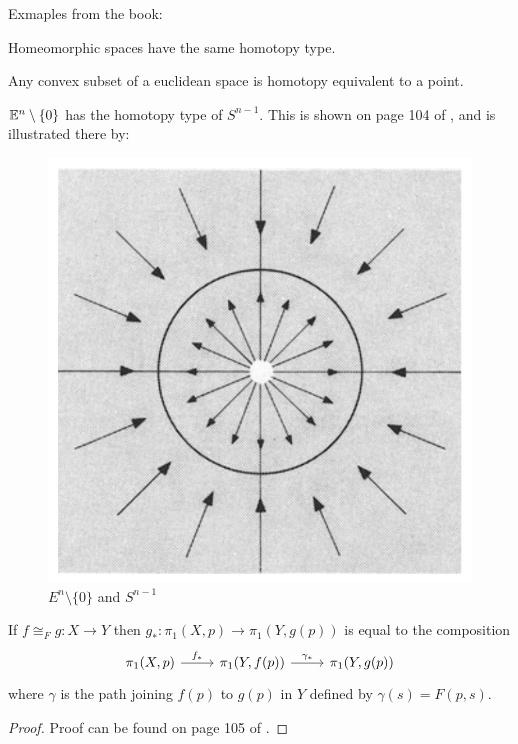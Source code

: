 Exmaples from the book:
\begin{ex}
    Homeomorphic spaces have the same homotopy type.
\end{ex}
\begin{ex}
    Any convex subset of a euclidean space is homotopy equivalent to a
    point.
\end{ex}
\begin{ex}
    $\mathbb{E}^n\setminus \{0\}$ has the homotopy type of $S^{n-1}$. This is
    shown on page 104 of \cite{book}, and is illustrated there by:
    \begin{figure}[H]
        \centering
        \includegraphics[width=0.6\linewidth]{pics/En-0-and-S-n-1.PNG}
        \caption{$E^n\setminus\{0\}$ and $S^{n-1}$}
    \end{figure}
\end{ex}

\begin{thm}
    If $f\cong_F g:X\to Y$ then $g_*:\pi_1(X,p)\to \pi_1(Y,g(p))$ is
    equal to the composition
    \begin{equation} \begin{tikzcd}[]
        \pi_1(X,p)\ar[r,"f_*"]&\pi_1(Y,f(p))\ar[r,"\gamma_*"]
            &\pi_1(Y,g(p))
    \end{tikzcd} \end{equation}
    where $\gamma$ is the path joining $f(p)$ to $g(p)$ in $Y$ defined
    by $\gamma(s)=F(p,s)$.
\end{thm}
\begin{proof}
    Proof can be found on page 105 of \cite{book}.
\end{proof}

